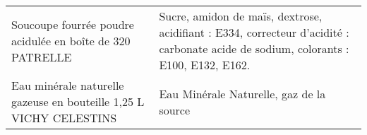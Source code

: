 \begin{longtable}{p{5cm}p{10cm}}
                                                Soucoupe fourrée poudre acidulée en boîte de 320 PATRELLE &                                                                                                                                                                                                                                                                                                                                                                                                                                                                                                                                                                                                                                                                                                                                                                                                                                                                                                    Sucre, amidon de maïs, dextrose, acidifiant : E334,   correcteur d'acidité : carbonate acide de sodium, colorants : E100, E132, E162. \\
                                       Eau minérale naturelle gazeuse en bouteille 1,25 L VICHY CELESTINS &                                                                                                                                                                                                                                                                                                                                                                                                                                                                                                                                                                                                                                                                                                                                                                                                                                                                                                                                                                                                 Eau Minérale Naturelle, gaz de la source \\

\end{longtable}
